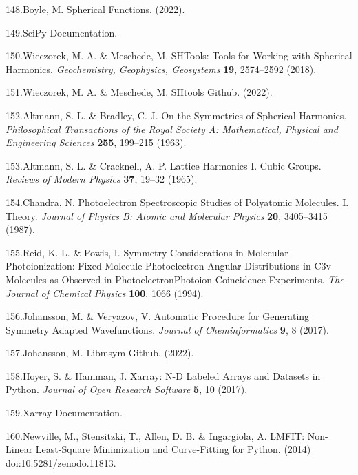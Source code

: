 \documentclass[10pt]{article}
\begin{document}
\label{csl:148}148.Boyle, M. {Spherical {{Functions}}}. (2022).

\label{csl:149}149.{{{SciPy}} Documentation}.

\label{csl:150}150.Wieczorek, M. A. \& Meschede, M. {{{SHTools}}: {{Tools}} for {{Working}} with {{Spherical Harmonics}}}. \textit{Geochemistry, Geophysics, Geosystems} \textbf{19}, 2574–2592 (2018).

\label{csl:151}151.Wieczorek, M. A. \& Meschede, M. {{SHtools Github}}. (2022).

\label{csl:152}152.Altmann, S. L. \& Bradley, C. J. {On the {{Symmetries}} of {{Spherical Harmonics}}}. \textit{Philosophical Transactions of the Royal Society A: Mathematical, Physical and Engineering Sciences} \textbf{255}, 199–215 (1963).

\label{csl:153}153.Altmann, S. L. \& Cracknell, A. P. {Lattice Harmonics {{I}}. {{Cubic}} Groups}. \textit{Reviews of Modern Physics} \textbf{37}, 19–32 (1965).

\label{csl:154}154.Chandra, N. {Photoelectron Spectroscopic Studies of Polyatomic Molecules. {{I}}. {{Theory}}}. \textit{Journal of Physics B: Atomic and Molecular Physics} \textbf{20}, 3405–3415 (1987).

\label{csl:155}155.Reid, K. L. \& Powis, I. {Symmetry Considerations in Molecular Photoionization: {{Fixed}} Molecule Photoelectron Angular Distributions in {{C3v}} Molecules as Observed in Photoelectron\textendash Photoion Coincidence Experiments}. \textit{The Journal of Chemical Physics} \textbf{100}, 1066 (1994).

\label{csl:156}156.Johansson, M. \& Veryazov, V. {Automatic Procedure for Generating Symmetry Adapted Wavefunctions}. \textit{Journal of Cheminformatics} \textbf{9}, 8 (2017).

\label{csl:157}157.Johansson, M. {Libmsym {{Github}}}. (2022).

\label{csl:158}158.Hoyer, S. \& Hamman, J. {Xarray: {{N-D}} Labeled {{Arrays}} and {{Datasets}} in {{Python}}}. \textit{Journal of Open Research Software} \textbf{5}, 10 (2017).

\label{csl:159}159.{Xarray Documentation}.

\label{csl:160}160.Newville, M., Stensitzki, T., Allen, D. B. \& Ingargiola, A. {{{LMFIT}}: {{Non-Linear Least-Square Minimization}} and {{Curve-Fitting}} for {{Python}}}. (2014) doi:10.5281/zenodo.11813.
\end{document}
